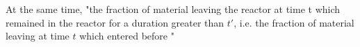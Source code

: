 At the same time, "the fraction of material leaving the reactor at time t which remained in the reactor for a duration greater than $t'$, i.e. the fraction of material leaving at time $t$ which entered before "  